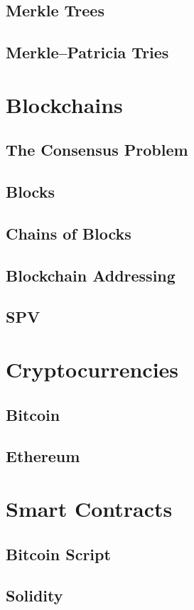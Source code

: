 \subsection{Merkle Trees}
\subsection{Merkle–Patricia Tries}

\section{Blockchains}
\subsection{The Consensus Problem}
\subsection{Blocks}
\subsection{Chains of Blocks}
\subsection{Blockchain Addressing}
\subsection{SPV}

\section{Cryptocurrencies}

\subsection{Bitcoin}
\subsection{Ethereum}

\section{Smart Contracts}
\subsection{Bitcoin Script}
\subsection{Solidity}

